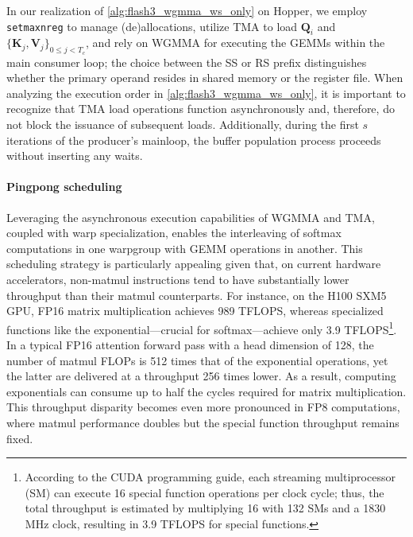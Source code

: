 In our realization of \cref{alg:flash3_wgmma_ws_only} on Hopper, we employ \verb|setmaxnreg| to manage (de)allocations, utilize TMA to load $\mathbf{Q}_i$ and $\{ \mathbf{K}_j, \mathbf{V}_j \}_{0 \leq j < T_c}$, and rely on WGMMA for executing the GEMMs within the main consumer loop; the choice between the SS or RS prefix distinguishes whether the primary operand resides in shared memory or the register file. When analyzing the execution order in \cref{alg:flash3_wgmma_ws_only}, it is important to recognize that TMA load operations function asynchronously and, therefore, do not block the issuance of subsequent loads. Additionally, during the first $s$ iterations of the producer’s mainloop, the buffer population process proceeds without inserting any waits.

\paragraph{Pingpong scheduling} Leveraging the asynchronous execution capabilities of WGMMA and TMA, coupled with warp specialization, enables the interleaving of softmax computations in one warpgroup with GEMM operations in another. This scheduling strategy is particularly appealing given that, on current hardware accelerators, non-matmul instructions tend to have substantially lower throughput than their matmul counterparts. For instance, on the H100 SXM5 GPU, FP16 matrix multiplication achieves 989 TFLOPS, whereas specialized functions like the exponential—crucial for softmax—achieve only 3.9 TFLOPS\footnote{According to the CUDA programming guide, each streaming multiprocessor (SM) can execute 16 special function operations per clock cycle; thus, the total throughput is estimated by multiplying 16 with 132 SMs and a 1830 MHz clock, resulting in 3.9 TFLOPS for special functions.}. In a typical FP16 attention forward pass with a head dimension of 128, the number of matmul FLOPs is 512 times that of the exponential operations, yet the latter are delivered at a throughput 256 times lower. As a result, computing exponentials can consume up to half the cycles required for matrix multiplication. This throughput disparity becomes even more pronounced in FP8 computations, where matmul performance doubles but the special function throughput remains fixed.

